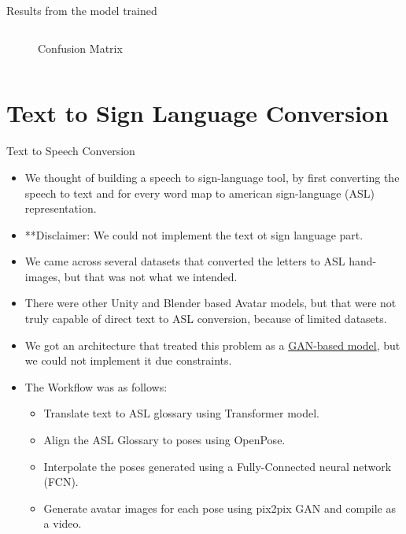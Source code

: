 \documentclass[10pt]{beamer}
\begin{document}
\begin{frame}{Results from the model trained}
\begin{columns}
\begin{column}{0.5\textwidth}
\begin{figure}
		\caption{Confusion Matrix}
	\end{figure}
	\end{column}
\end{columns}
\end{frame}

\section{Text to Sign Language Conversion}
\begin{frame}{Text to Speech Conversion}
\begin{itemize}
	\item We thought of building a speech to sign-language tool, by first converting the speech to text and for every word map to american sign-language (ASL) representation.
	\item \textcolor{red!60!white}{**Disclaimer:
{\small We could not implement the text ot sign language part.}}
	\item We came across several datasets that converted the letters to ASL hand-images, but that was not what we intended.
	\item There were other Unity and Blender based Avatar models, but that were not truly capable of direct text to ASL conversion, because of limited datasets.
	\item We got an architecture that treated this problem as a \href{https://github.com/arunnair411/Speech-to-ASL}{GAN-based model}, but we could not implement  it due constraints.
	\item The Workflow was as follows:
	\begin{itemize}
		\item Translate text to ASL glossary using Transformer model.
		\item Align the ASL Glossary to poses using OpenPose.
		\item Interpolate the poses generated using a Fully-Connected neural network (FCN).
		\item Generate avatar images for each pose using pix2pix GAN and compile as a video.
	\end{itemize}
\end{itemize}
\end{frame}
\end{document}
